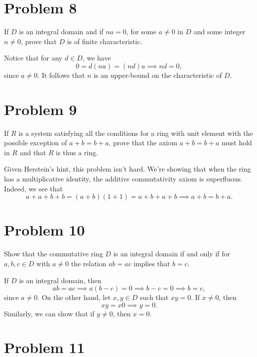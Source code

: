 \documentclass[12pt]{article}
\begin{document}
\section*{Problem 8}

If $D$ is an integral domain and if $na=0$, for some $a\neq 0$ in $D$ and
some integer $n\neq 0$, prove that $D$ is of finite characteristic.

Notice that for any $d\in D$, we have
\begin{equation*}
0 = d(na) = (nd)a\implies nd=0,
\end{equation*}
since $a\neq 0$.  It follows that $n$ is an upper-bound on the characteristic of $D$.

\section*{Problem 9}

If $R$ is a system satisfying all the conditions for a ring with unit element with the possible exception
of $a+b=b+a$, prove that the axiom $a+b=b+a$ must hold in $R$ and that $R$ is thus a ring.

Given Herstein's hint, this problem isn't hard.  We're showing that when the ring has a multiplicative identity,
the additive commutativity axiom is superfluous.  Indeed, we see that
\begin{equation*}
a+a+b+b=(a+b)(1+1)=a+b+a+b\implies a+b=b+a.
\end{equation*}

\section*{Problem 10}

Show that the commutative ring $D$ is an integral domain if and only if for
$a,b,c\in D$ with $a\neq 0$ the relation $ab=ac$ implies that $b=c$.

If $D$ is an integral domain, then
\begin{equation*}
ab=ac\implies a(b-c)=0\implies b-c=0\implies b=c,
\end{equation*}
since $a\neq 0$.
On the other hand, let $x,y\in D$ such that $xy=0$.  If $x\neq 0$, then
\begin{equation*}
xy = x0\implies y=0.
\end{equation*}
Similarly, we can show that if $y\neq 0$, then $x=0$.

\section*{Problem 11}
\end{document}
